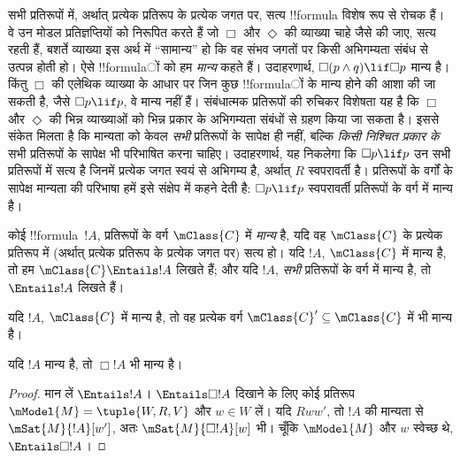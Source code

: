 \documentclass[../../../include/open-logic-section]{subfiles}
\begin{document}


\begin{explain}
  सभी प्रतिरूपों में, अर्थात् प्रत्येक प्रतिरूप के प्रत्येक जगत पर, सत्य
  !!{formula} विशेष रूप से रोचक हैं। वे उन मोडल प्रतिज्ञप्तियों को निरूपित करते
  हैं जो $\Box$ और $\Diamond$ की व्याख्या चाहे जैसे की जाए, सत्य रहती हैं,
  बशर्ते व्याख्या इस अर्थ में ``सामान्य'' हो कि वह संभव जगतों पर किसी
  अभिगम्यता संबंध से उत्पन्न होती हो। ऐसे !!{formula}ों को हम \emph{मान्य}
  कहते हैं। उदाहरणार्थ, $\Box(p \land q) \lif \Box p$ मान्य है। किंतु
  $\Box$ की एलेथिक व्याख्या के आधार पर जिन कुछ !!{formula}ों के मान्य होने की
  आशा की जा सकती है, जैसे $\Box p \lif p$, वे मान्य नहीं हैं। संबंधात्मक
  प्रतिरूपों की रुचिकर विशेषता यह है कि $\Box$ और $\Diamond$ की भिन्न
  व्याख्याओं को भिन्न प्रकार के अभिगम्यता संबंधों से ग्रहण किया जा सकता है।
  इससे संकेत मिलता है कि मान्यता को केवल \emph{सभी} प्रतिरूपों के सापेक्ष ही
  नहीं, बल्कि \emph{किसी निश्चित प्रकार के} सभी प्रतिरूपों के सापेक्ष भी
  परिभाषित करना चाहिए। उदाहरणार्थ, यह निकलेगा कि $\Box p \lif p$ उन सभी
  प्रतिरूपों में सत्य है जिनमें प्रत्येक जगत स्वयं से अभिगम्य है, अर्थात्
  $R$ स्वपरावर्ती है। प्रतिरूपों के वर्गों के सापेक्ष मान्यता की परिभाषा
  हमें इसे संक्षेप में कहने देती है: $\Box p \lif p$ स्वपरावर्ती प्रतिरूपों
  के वर्ग में मान्य है।
\end{explain}

\begin{defn}
  कोई !!{formula}~$!A$, प्रतिरूपों के वर्ग $\mClass{C}$ में \emph{मान्य} है,
  यदि वह $\mClass{C}$ के प्रत्येक प्रतिरूप में (अर्थात् प्रत्येक प्रतिरूप के
  प्रत्येक जगत पर) सत्य हो। यदि $!A$, $\mClass{C}$ में मान्य है, तो हम
  $\mClass{C} \Entails !A$ लिखते हैं; और यदि $!A$, \emph{सभी} प्रतिरूपों
  के वर्ग में मान्य है, तो $\Entails !A$ लिखते हैं।
\end{defn}

\begin{prop}
  यदि $!A$, $\mClass{C}$ में मान्य है, तो वह प्रत्येक वर्ग
  $\mClass{C}' \subseteq \mClass{C}$ में भी मान्य है।
\end{prop}

\begin{prop}
  यदि $!A$ मान्य है, तो $\Box!A$ भी मान्य है।
\end{prop}

\begin{proof}
  मान लें $\Entails !A$। $\Entails \Box!A$ दिखाने के लिए कोई प्रतिरूप
  $\mModel{M} = \tuple{W, R, V}$ और $w \in W$ लें। यदि $Rww'$, तो $!A$ की
  मान्यता से $\mSat{M}{!A}[w']$, अतः $\mSat{M}{\Box!A}[w]$ भी। चूँकि
  $\mModel{M}$ और $w$ स्वेच्छ थे, $\Entails \Box!A$।
\end{proof}
\end{document}
